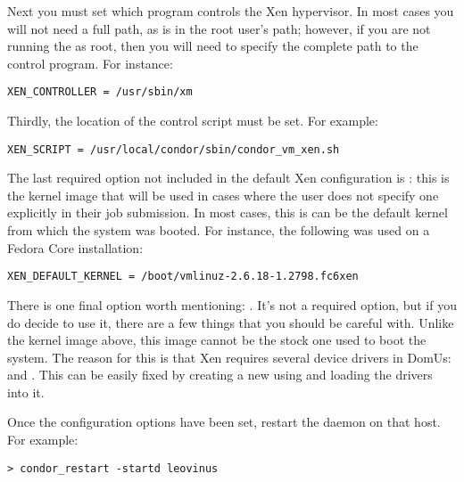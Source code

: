 Next you must set which program controls the Xen hypervisor.  In most cases 
you will not need a full path, as  is in the root user's 
path; however, if you are not running the  as root,
then you will need 
to specify the complete path to the control program.  For instance:

\begin{verbatim}
XEN_CONTROLLER = /usr/sbin/xm
\end{verbatim}

Thirdly, the location of the control script must be set.  For example:

\begin{verbatim}
XEN_SCRIPT = /usr/local/condor/sbin/condor_vm_xen.sh
\end{verbatim}

The last required option not included in the default Xen configuration is
: this is the kernel image that will be used
in cases where the user does not specify one explicitly in their job
submission.  In most cases, this is can be the default kernel from which
the system was booted.  For instance, the following was used on a Fedora
Core installation:

\begin{verbatim}
XEN_DEFAULT_KERNEL = /boot/vmlinuz-2.6.18-1.2798.fc6xen
\end{verbatim}

There is one final option worth mentioning: .  
It's not a required option, but if you do decide to use it, there are a 
few things that you should be careful with.  Unlike the kernel image above,
this image cannot be the stock one used to boot the system.  The reason
for this is that Xen requires several device drivers in DomUs:  
and .  This can be easily fixed by creating a new 
using  and loading the drivers into it.


Once the configuration options have been set, restart the  
daemon on that host.  For example:

\begin{verbatim}
> condor_restart -startd leovinus
\end{verbatim}

